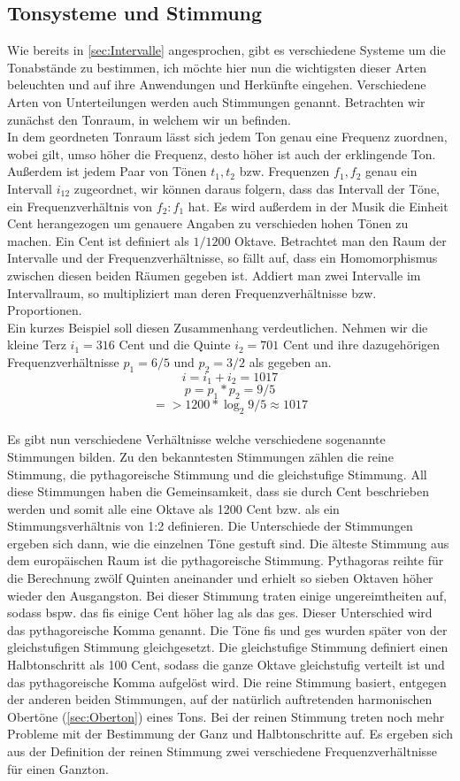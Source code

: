 \subsection*{Tonsysteme und Stimmung}
\label{sec:Tonsysteme}
Wie bereits in \ref{sec:Intervalle} angesprochen, gibt es verschiedene Systeme um die Tonabstände zu bestimmen, ich möchte hier nun die wichtigsten dieser Arten beleuchten und auf ihre Anwendungen und Herkünfte eingehen.
Verschiedene Arten von Unterteilungen werden auch Stimmungen genannt. Betrachten wir zunächst den Tonraum, in welchem wir un befinden. \\
In dem geordneten Tonraum lässt sich jedem Ton genau eine Frequenz zuordnen, wobei gilt, umso höher die Frequenz, desto höher ist auch der erklingende Ton. Außerdem ist jedem Paar von Tönen $t_1, t_2$ bzw. Frequenzen $f_1, f_2$ genau ein Intervall $i_{12}$ zugeordnet, 
wir können daraus folgern, dass das Intervall der Töne, ein Frequenzverhältnis von $f_2 : f_1$ hat. Es wird außerdem in der Musik die Einheit Cent herangezogen um genauere Angaben zu verschieden hohen Tönen zu machen. Ein Cent ist definiert als 
$1/1200$ Oktave. Betrachtet man den Raum der Intervalle und der Frequenzverhältnisse, so fällt auf, dass ein Homomorphismus zwischen diesen beiden Räumen gegeben ist. Addiert man zwei Intervalle im Intervallraum, so multipliziert man deren Frequenzverhältnisse bzw. Proportionen. \\
Ein kurzes Beispiel soll diesen Zusammenhang verdeutlichen. Nehmen wir die kleine Terz $i_1 =  316$ Cent und die Quinte $i_2 =  701$ Cent und ihre dazugehörigen Frequenzverhältnisse $p_1 = 6/5$ und $p_2 = 3/2$ als gegeben an.
$$    i = i_1 + i_2 = 1017  $$
$$    p = p_1 * p_2 = 9/5   $$
$$   => 1200 * \log_2{9/5} \approx 1017     $$
\\
Es gibt nun verschiedene Verhältnisse welche verschiedene sogenannte Stimmungen bilden. Zu den bekanntesten Stimmungen zählen die reine Stimmung, die pythagoreische Stimmung und die gleichstufige Stimmung.
All diese Stimmungen haben die Gemeinsamkeit, dass sie durch Cent beschrieben werden und somit alle eine Oktave als 1200 Cent bzw. als ein Stimmungsverhältnis von 1:2 definieren. Die Unterschiede der Stimmungen ergeben sich dann, wie die einzelnen
Töne gestuft sind. Die älteste Stimmung aus dem europäischen Raum ist die pythagoreische Stimmung. Pythagoras reihte für die Berechnung zwölf Quinten aneinander und erhielt so sieben Oktaven höher wieder den Ausgangston. Bei dieser Stimmung traten einige 
ungereimtheiten auf, sodass bspw. das fis einige Cent höher lag als das ges. Dieser Unterschied wird das pythagoreische Komma genannt. Die Töne fis und ges wurden später von der gleichstufigen Stimmung gleichgesetzt. Die gleichstufige Stimmung definiert einen Halbtonschritt als 100 Cent, sodass die ganze Oktave gleichstufig verteilt ist und das
pythagoreische Komma aufgelöst wird. Die reine Stimmung basiert, entgegen der anderen beiden Stimmungen, auf der natürlich auftretenden harmonischen Obertöne (\ref{sec:Oberton}) eines Tons. Bei der reinen Stimmung treten noch mehr Probleme mit der Bestimmung der Ganz und Halbtonschritte auf. Es ergeben sich aus der Definition der reinen Stimmung zwei verschiedene Frequenzverhältnisse für einen Ganzton. \cite{abcmusik}

